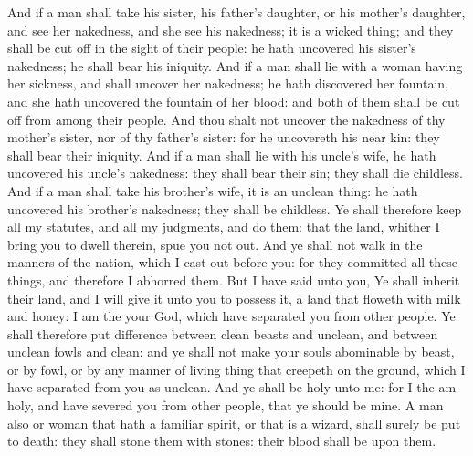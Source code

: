 \begin{biblechapter}
\verse And if a man shall take his sister, his father's daughter, or his mother's daughter, and see her nakedness, and she see his nakedness; it is a wicked thing; and they shall be cut off in the sight of their people: he hath uncovered his sister's nakedness; he shall bear his iniquity.
\verse And if a man shall lie with a woman having her sickness, and shall uncover her nakedness; he hath discovered her fountain, and she hath uncovered the fountain of her blood: and both of them shall be cut off from among their people.
\verse And thou shalt not uncover the nakedness of thy mother's sister, nor of thy father's sister: for he uncovereth his near kin: they shall bear their iniquity.
\verse And if a man shall lie with his uncle's wife, he hath uncovered his uncle's nakedness: they shall bear their sin; they shall die childless.
\verse And if a man shall take his brother's wife, it is an unclean thing: he hath uncovered his brother's nakedness; they shall be childless.
\verse Ye shall therefore keep all my statutes, and all my judgments, and do them: that the land, whither I bring you to dwell therein, spue you not out.
\verse And ye shall not walk in the manners of the nation, which I cast out before you: for they committed all these things, and therefore I abhorred them.
\verse But I have said unto you, Ye shall inherit their land, and I will give it unto you to possess it, a land that floweth with milk and honey: I am the \LORD your God, which have separated you from other people.
\verse Ye shall therefore put difference between clean beasts and unclean, and between unclean fowls and clean: and ye shall not make your souls abominable by beast, or by fowl, or by any manner of living thing that creepeth on the ground, which I have separated from you as unclean.
\verse And ye shall be holy unto me: for I the \LORD am holy, and have severed you from other people, that ye should be mine.
\verse A man also or woman that hath a familiar spirit, or that is a wizard, shall surely be put to death: they shall stone them with stones: their blood shall be upon them.
\end{biblechapter}

